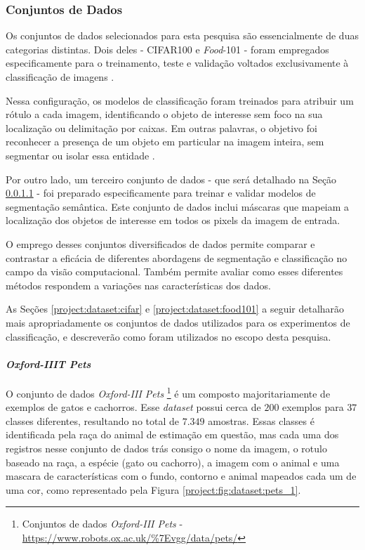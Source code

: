\subsubsection{Conjuntos de Dados}
\label{project:dataset}
Os conjuntos de dados selecionados para esta pesquisa são essencialmente de duas categorias distintas. Dois deles - CIFAR100 e \textit{Food}-101 - foram empregados especificamente para o treinamento, teste e validação voltados exclusivamente à classificação de imagens \citep{Krizhevsky2009LearningImages, Bossard2014Food-101Forests}.

Nessa configuração, os modelos de classificação foram treinados para atribuir um rótulo a cada imagem, identificando o objeto de interesse sem foco na sua localização ou delimitação por caixas. Em outras palavras, o objetivo foi reconhecer a presença de um objeto em particular na imagem inteira, sem segmentar ou isolar essa entidade \citep{Viitaniemi2008TechniquesSegmentation}.

Por outro lado, um terceiro conjunto de dados - que será detalhado na Seção \ref{project:dataset:pets} - foi preparado especificamente para treinar e validar modelos de segmentação semântica. Este conjunto de dados inclui máscaras que mapeiam a localização dos objetos de interesse em todos os pixels da imagem de entrada.

O emprego desses conjuntos diversificados de dados permite comparar e contrastar a eficácia de diferentes abordagens de segmentação e classificação no campo da visão computacional. Também permite avaliar como esses diferentes métodos respondem a variações nas características dos dados.

As Seções \ref{project:dataset:cifar} e \ref{project:dataset:food101} a seguir detalharão mais apropriadamente os conjuntos de dados utilizados para os experimentos de classificação, e descreverão como foram utilizados no escopo desta pesquisa.

\paragraph{\textit{Oxford-IIIT Pets}}
\label{project:dataset:pets}

O conjunto de dados \textit{Oxford-III Pets} \footnote{Conjuntos de dados \textit{Oxford-III Pets} - \url{https://www.robots.ox.ac.uk/\%7Evgg/data/pets/}} \citep{Parkhi2012CatsDogs} é um composto majoritariamente de exemplos de gatos e cachorros. Esse \textit{dataset} possui cerca de $200$ exemplos para $37$ classes diferentes, resultando no total de $7.349$ amostras. Essas classes é identificada pela raça do animal de estimação em questão, mas cada uma dos registros nesse conjunto de dados trás consigo o nome da imagem, o rotulo baseado na raça, a espécie (gato ou cachorro), a imagem com o animal e uma mascara de características com o fundo, contorno e animal mapeados cada um de uma cor, como representado pela Figura \ref{project:fig:dataset:pets_1}.

